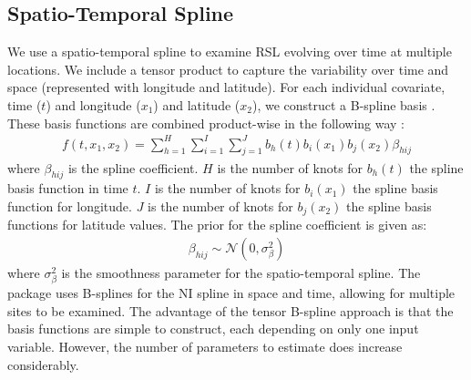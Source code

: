 \subsection{Spatio-Temporal Spline}\label{spatialtemporalspline}
We use a spatio-temporal spline to examine RSL evolving over time at multiple locations. We include a tensor product to capture the variability over time and space (represented with longitude and latitude). For each individual covariate, time (\(t\)) and longitude (\(x_1\)) and latitude (\(x_2\)), we construct a B-spline basis \citep{Wood2017pspline}. These basis functions are combined product-wise in the following way \citep{Wood2006a}:
\begin{align}
  f(t,x_1,x_2) = \sum_{h=1}^{H}\sum_{i=1}^{I}\sum_{j=1}^{J} b_h(t) b_i(x_1) b_j(x_2) \beta_{hij}
\end{align}
where \(\beta_{hij}\) is the spline coefficient. \(H\) is the number of knots for \(b_h(t)\) the spline basis function in time \(t\). \(I\) is the number of knots for \(b_i(x_1)\) the spline basis function for longitude. \(J\) is the number of knots for \(b_j(x_2)\) the spline basis functions for latitude values. The prior for the spline coefficient is given as:
\begin{align}
\beta_{hij} \sim \mathcal{N} (0, \sigma^2_{\beta})
\end{align}
where \(\sigma^2_{\beta}\) is the smoothness parameter for the spatio-temporal spline. The  package uses B-splines for the NI spline in space and time, allowing for multiple sites to be examined. The advantage of the tensor B-spline approach is that the basis functions are simple to construct, each depending on only one input variable. However, the number of parameters to estimate does increase considerably.
